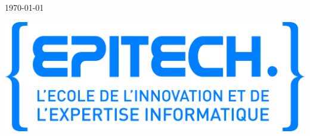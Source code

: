 \begin{titlepage}
\begin{center}
    \vfill

    {\large \today}

  \end{center}

  \begin{flushright}
    \vspace{1cm}
    \includegraphics[scale=0.03]{Logo-Epitech}
  \end{flushright}

\end{titlepage}

